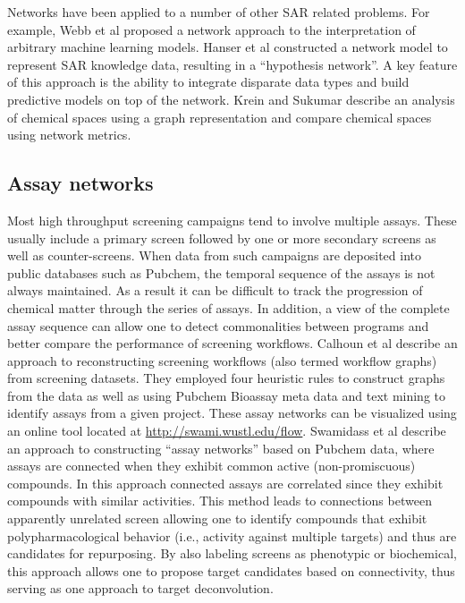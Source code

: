 \documentclass[]{book}
\begin{document}
Networks have been applied to a number of other SAR related
problems. For example, Webb et al \cite{Webb:2014tp} proposed a
network approach to the interpretation of arbitrary machine learning
models. Hanser et al \cite{Hanser:2014gl} constructed a network model
to represent SAR knowledge data, resulting in a ``hypothesis
network''. A key feature of this approach is the ability to integrate
disparate data types and build predictive models on top of the
network. Krein and Sukumar \cite{Krein:2011tt} describe an analysis of
chemical spaces using a graph representation and compare chemical
spaces using network metrics.

\subsection{Assay networks}
\label{sec:assay-networks}

Most high throughput screening campaigns tend to involve multiple
assays. These usually include a primary screen followed by one or more
secondary screens as well as counter-screens. When data from such
campaigns are deposited into public databases such as Pubchem, the
temporal sequence of the assays is not always maintained. As a result
it can be difficult to track the progression of chemical matter
through the series of assays. In addition, a view of the complete
assay sequence can allow one to detect commonalities between programs
and better compare the performance of screening workflows. Calhoun et
al \cite{Calhoun:2012uq} describe an approach to reconstructing
screening workflows (also termed workflow graphs) from screening
datasets. They employed four heuristic rules to construct graphs from
the data as well as using Pubchem Bioassay meta data and text mining
to identify assays from a given project. These assay networks can be
visualized using an online tool located at
\href{http://swami.wustl.edu/flow}{http://swami.wustl.edu/flow}.
Swamidass et al \cite{Swamidass:2014vn} describe an approach to
constructing ``assay networks'' based on Pubchem data, where assays
are connected when they exhibit common active (non-promiscuous)
compounds. In this approach connected assays are correlated since they
exhibit compounds with similar activities. This method leads to
connections between apparently unrelated screen allowing one to
identify compounds that exhibit polypharmacological behavior (i.e.,
activity against multiple targets) and thus are candidates for
repurposing. By also labeling screens as phenotypic or biochemical,
this approach allows one to propose target candidates based on
connectivity, thus serving as one approach to target deconvolution.
\end{document}
